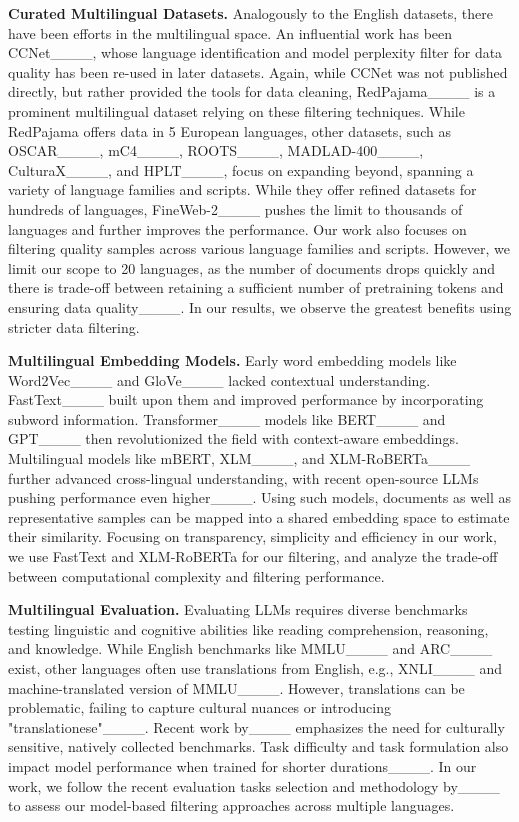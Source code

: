 \textbf{Curated Multilingual Datasets.} Analogously to the English datasets, there have been efforts in the multilingual space. An influential work has been CCNet____, whose language identification and model perplexity filter for data quality has been re-used in later datasets. Again, while CCNet was not published directly, but rather provided the tools for data cleaning, RedPajama____ is a prominent multilingual dataset relying on these filtering techniques. While RedPajama offers data in 5 European languages, other datasets, such as OSCAR____, mC4____, ROOTS____, MADLAD-400____, CulturaX____, and HPLT____, focus on expanding beyond, spanning a variety of language families and scripts. While they offer refined datasets for hundreds of languages, FineWeb-2____ pushes the limit to thousands of languages and further improves the performance. Our work also focuses on filtering quality samples across various language families and scripts. However, we limit our scope to 20 languages, as the number of documents drops quickly and there is trade-off between retaining a sufficient number of pretraining tokens and ensuring data quality____.
In our results, we observe the greatest benefits using stricter data filtering.

\textbf{Multilingual Embedding Models.} Early word embedding models like Word2Vec____ and GloVe____ lacked contextual understanding. FastText____ built upon them and improved performance by incorporating subword information. Transformer____ models like BERT____ and GPT____ then revolutionized the field with context-aware embeddings. Multilingual models like mBERT, XLM____, and XLM-RoBERTa____ further advanced cross-lingual understanding, with recent open-source LLMs pushing performance even higher____. Using such models,  documents as well as representative samples can be mapped into a shared embedding space to estimate their similarity. Focusing on transparency, simplicity and efficiency in our work, we use FastText and XLM-RoBERTa for our %
filtering, and analyze the trade-off between computational complexity and filtering performance.


\textbf{Multilingual Evaluation.} Evaluating LLMs requires diverse benchmarks testing linguistic and cognitive abilities like reading comprehension, reasoning, and knowledge.  While English benchmarks like MMLU____ and ARC____ exist, other languages often use translations from English, e.g., XNLI____ and machine-translated version of MMLU____. However, translations can be problematic, failing to capture cultural nuances or introducing "translationese"____. Recent work by____ emphasizes the need for culturally sensitive, natively collected benchmarks. Task difficulty and task formulation also impact model performance when trained for shorter durations____. In our work, we follow the recent evaluation tasks selection and methodology by____ to assess our model-based filtering approaches across multiple languages.